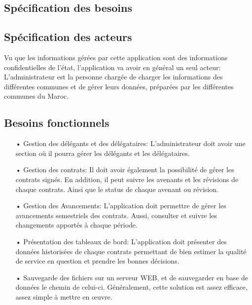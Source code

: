 \documentclass[a4paper]{report}
\begin{document}
\begin{doublespace}
	\section{Spécification des besoins}

	\subsection{Spécification des acteurs}
	Vu que les informations gérées par cette application sont des informations confidentielles de l'état, l'application va avoir en général un seul acteur:
	L'administrateur est la personne chargée de charger les informations des différentes communes et de gérer leurs données, préparées par les différentes communes du Maroc.
	\subsection{Besoins fonctionnels}
	\begin{itemize}
		\item[•] Gestion des délégants et des délégataires: L'administrateur doit avoir
		      une section où il pourra gérer les délégants et les délégataires.
		\item[•] Gestion des contrats: Il doit avoir également la possibilité de gérer les contrats signés. En addition, il peut suivre les avenants et les révisions de chaque contrats. Ainsi que le status de chaque avenant ou révision.
		\item[•] Gestion des Avancements: L'application doit permettre de gérer les avancements semestriels des contrats. Aussi, consulter et suivre les changements apportés à chaque période.
		\item[•] Présentation des tableaux de bord: L'application doit présenter des données historisées de chaque contrats permettant de bien estimer la qualité de service en question et prendre les bonnes décisions.
		\item[•] Sauvegarde des fichiers sur un serveur WEB, et de sauvegarder en base de données le chemin de celui-ci. Généralement, cette solution est assez efficace, assez simple à mettre en œuvre.
	\end{itemize}

\end{doublespace}
\end{document}
